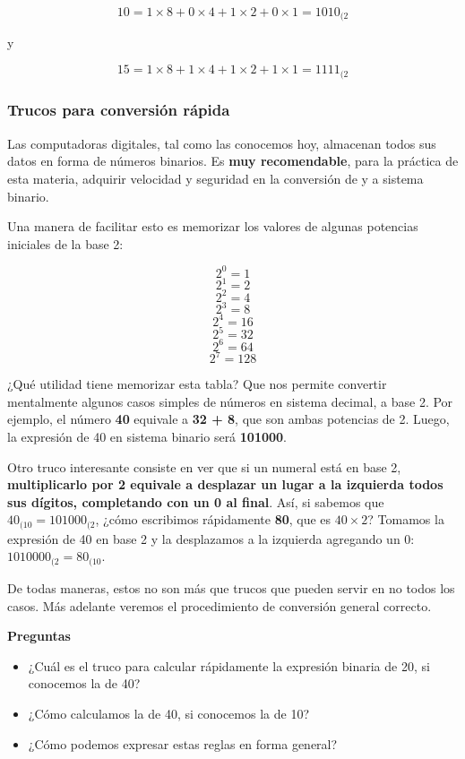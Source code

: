 \documentclass[spanish,A4,]{article}
\begin{document}
\[10 = 1\times8 + 0\times4 + 1\times2 + 0\times1 = 1010_{(2}\]

y

\[15 = 1\times8 + 1\times4 + 1\times2 + 1\times1 = 1111_{(2}\]

\subsubsection{Trucos para conversión
rápida}\label{trucos-para-conversiuxf3n-ruxe1pida}

Las computadoras digitales, tal como las conocemos hoy, almacenan todos
sus datos en forma de números binarios. Es \textbf{muy recomendable},
para la práctica de esta materia, adquirir velocidad y seguridad en la
conversión de y a sistema binario.

Una manera de facilitar esto es memorizar los valores de algunas
potencias iniciales de la base 2:

\[2^0 = 1\] \[2^1 = 2\] \[2^2 = 4\] \[2^3 = 8\] \[2^4 = 16\]
\[2^5 = 32\] \[2^6 = 64\] \[2^7 = 128\]

¿Qué utilidad tiene memorizar esta tabla? Que nos permite convertir
mentalmente algunos casos simples de números en sistema decimal, a base
2. Por ejemplo, el número \textbf{40} equivale a \textbf{32 + 8}, que
son ambas potencias de 2. Luego, la expresión de 40 en sistema binario
será \textbf{101000}.

Otro truco interesante consiste en ver que si un numeral está en base 2,
\textbf{multiplicarlo por 2 equivale a desplazar un lugar a la izquierda
todos sus dígitos, completando con un 0 al final}. Así, si sabemos que
$40_{(10} = 101000_{(2}$, ¿cómo escribimos rápidamente \textbf{80}, que
es $40\times2$? Tomamos la expresión de 40 en base 2 y la desplazamos a
la izquierda agregando un 0: $1010000_{(2} = 80_{(10}$.

De todas maneras, estos no son más que trucos que pueden servir en no
todos los casos. Más adelante veremos el procedimiento de conversión
general correcto.

\textbf{Preguntas}

\begin{itemize}
\itemsep1pt\parskip0pt
\item
  ¿Cuál es el truco para calcular rápidamente la expresión binaria de
  20, si conocemos la de 40?
\item
  ¿Cómo calculamos la de 40, si conocemos la de 10?
\item
  ¿Cómo podemos expresar estas reglas en forma general?
\end{itemize}
\end{document}
